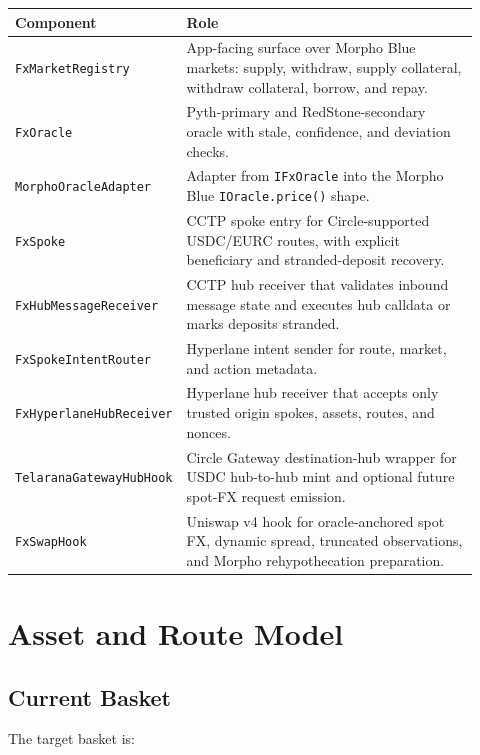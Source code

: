 \documentclass[11pt]{article}
\begin{document}
\begin{center}
\begin{tabular}{p{0.24\linewidth}p{0.68\linewidth}}
\toprule
Component & Role \\
\midrule
\texttt{FxMarketRegistry} & App-facing surface over Morpho Blue markets:
supply, withdraw, supply collateral, withdraw collateral, borrow, and repay. \\
\texttt{FxOracle} & Pyth-primary and RedStone-secondary oracle with stale,
confidence, and deviation checks. \\
\texttt{MorphoOracleAdapter} & Adapter from \texttt{IFxOracle} into the
Morpho Blue \texttt{IOracle.price()} shape. \\
\texttt{FxSpoke} & CCTP spoke entry for Circle-supported USDC/EURC routes,
with explicit beneficiary and stranded-deposit recovery. \\
\texttt{FxHubMessageReceiver} & CCTP hub receiver that validates inbound
message state and executes hub calldata or marks deposits stranded. \\
\texttt{FxSpokeIntentRouter} & Hyperlane intent sender for route, market, and
action metadata. \\
\texttt{FxHyperlaneHubReceiver} & Hyperlane hub receiver that accepts only
trusted origin spokes, assets, routes, and nonces. \\
\texttt{TelaranaGatewayHubHook} & Circle Gateway destination-hub wrapper for
USDC hub-to-hub mint and optional future spot-FX request emission. \\
\texttt{FxSwapHook} & Uniswap v4 hook for oracle-anchored spot FX, dynamic
spread, truncated observations, and Morpho rehypothecation preparation. \\
\bottomrule
\end{tabular}
\end{center}

\section{Asset and Route Model}

\subsection{Current Basket}

The target basket is:
\end{document}

